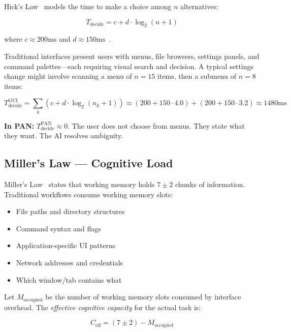 \documentclass[11pt, a4paper]{article}
\begin{document}
Hick's Law~\cite{hick1952} models the time to make a choice among $n$
alternatives:

\begin{equation}
  T_{\text{decide}} = c + d \cdot \log_2(n + 1)
  \label{eq:hick}
\end{equation}

where $c \approx 200\text{ms}$ and $d \approx 150\text{ms}$~\cite{seow2005}.

Traditional interfaces present users with menus, file browsers, settings panels,
and command palettes---each requiring visual search and decision. A typical
settings change might involve scanning a menu of $n = 15$ items, then a submenu
of $n = 8$ items:

\begin{equation}
  T_{\text{decide}}^{\text{GUI}} = \sum_{k} \left(c + d \cdot \log_2(n_k + 1)\right)
  \approx (200 + 150 \cdot 4.0) + (200 + 150 \cdot 3.2) \approx 1480\text{ms}
\end{equation}

\textbf{In PAN:} $T_{\text{decide}}^{\text{PAN}} \approx 0$. The user does not
choose from menus. They state what they want. The AI resolves ambiguity.

\subsection{Miller's Law --- Cognitive Load}

Miller's Law~\cite{miller1956} states that working memory holds $7 \pm 2$ chunks
of information. Traditional workflows consume working memory slots:

\begin{itemize}[noitemsep]
  \item File paths and directory structures
  \item Command syntax and flags
  \item Application-specific UI patterns
  \item Network addresses and credentials
  \item Which window/tab contains what
\end{itemize}

Let $M_{\text{occupied}}$ be the number of working memory slots consumed by
interface overhead. The \emph{effective cognitive capacity} for the actual task
is:

\begin{equation}
  C_{\text{eff}} = (7 \pm 2) - M_{\text{occupied}}
  \label{eq:miller}
\end{equation}
\end{document}
